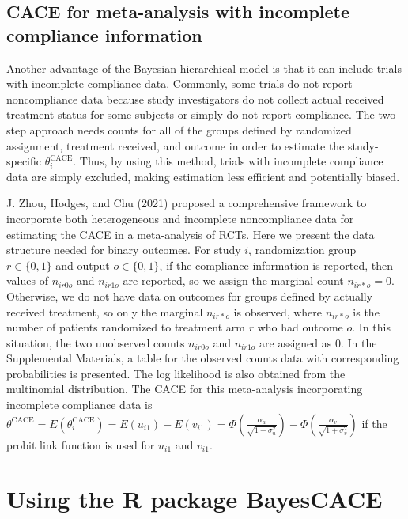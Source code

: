 \hypertarget{cace-for-meta-analysis-with-incomplete-compliance-information}{%
\subsection{CACE for meta-analysis with incomplete compliance information}\label{cace-for-meta-analysis-with-incomplete-compliance-information}}

Another advantage of the Bayesian hierarchical model is that it can include trials with incomplete compliance data.
Commonly, some trials do not report noncompliance data because study investigators do not collect actual received treatment status for some subjects or simply do not report compliance.
The two-step approach needs counts for all of the groups defined by randomized assignment, treatment received, and outcome in order to estimate the study-specific \(\theta^\text{CACE}_i\). Thus, by using this method, trials with incomplete compliance data are simply excluded, making estimation less efficient and potentially biased.

J. Zhou, Hodges, and Chu (2021) proposed a comprehensive framework to incorporate both heterogeneous and incomplete noncompliance data for estimating the CACE in a meta-analysis of RCTs. Here we present the data structure needed for binary outcomes.
For study \(i\), randomization group \(r \in \{0, 1\}\) and output \(o \in \{0, 1\}\), if the compliance information is reported, then values of \(n_{ir0o}\) and \(n_{ir1o}\) are reported, so we assign the marginal count \(n_{ir*o}=0\). Otherwise, we do not have data on outcomes for groups defined by actually received treatment, so only the marginal \(n_{ir*o}\) is observed, where \(n_{ir*o}\) is the number of patients randomized to treatment arm \(r\) who had outcome \(o\). In this situation, the two unobserved counts \(n_{ir0o}\) and \(n_{ir1o}\) are assigned as 0.
In the Supplemental Materials, a table for the observed counts data with corresponding probabilities is presented. The log likelihood is also obtained from the multinomial distribution.
The CACE for this meta-analysis incorporating incomplete compliance data is \(\theta^\text{CACE} = E(\theta^\text{CACE}_i) = E(u_{i1}) - E(v_{i1}) = \Phi(\frac{\alpha_u}{\sqrt{1+{\sigma}^2_u}}) - \Phi(\frac{\alpha_v}{\sqrt{1+{\sigma}^2_v}})\) if the probit link function is used for \(u_{i1}\) and \(v_{i1}\).

\hypertarget{using-the-r-package-bayescace}{%
\section{Using the R package BayesCACE}\label{using-the-r-package-bayescace}}

